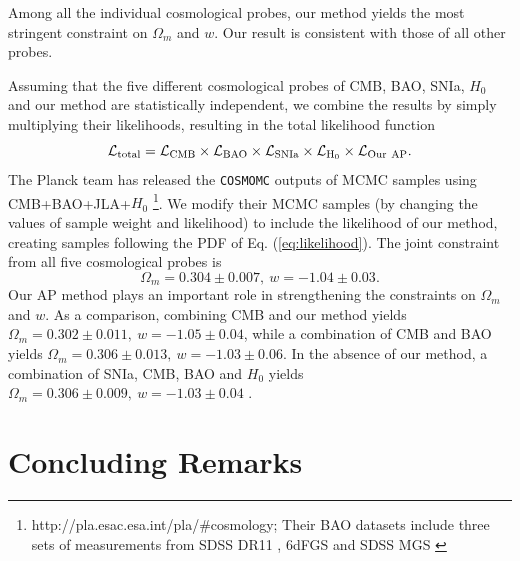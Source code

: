\documentclass[iop]{emulateapj}
\begin{document}
Among all the individual cosmological probes, our method yields the most stringent 
constraint on $\Omega_m$ and $w$.
Our result is consistent with those of all other probes.

Assuming that the five different cosmological probes of CMB, BAO, SNIa, $H_0$ and our method are 
statistically independent,
we combine the results by simply multiplying their likelihoods,
resulting in the total likelihood function
\begin{equation}\label{eq:likelihood}
\mathcal{L}_{\rm total} = \mathcal{L}_{\rm CMB} \times \mathcal{L}_{\rm BAO} \times \mathcal{L}_{\rm SNIa}\times \mathcal{L}_{\rm H_0}
 \times \mathcal{L}_{\rm Our\ AP}.
\end{equation}
The Planck team has released the {\texttt {COSMOMC}} outputs of MCMC samples
using CMB+BAO+JLA+$H_0$
\footnote{http://pla.esac.esa.int/pla/\#cosmology; 
Their BAO datasets include three sets of measurements from SDSS DR11 \citep{Anderson2013}, 6dFGS \citep{6dFGS} and SDSS MGS \citep{MGS}}.
We modify their MCMC samples (by changing the values of sample weight and likelihood)
 to include the likelihood of our method,
creating samples following the PDF of Eq. (\ref{eq:likelihood}).
The joint constraint from all five cosmological probes is
\begin{equation}
 \Omega_m = 0.304 \pm 0.007,\ w=-1.04 \pm 0.03.
\end{equation}
Our AP method plays an important role in strengthening the constraints on $\Omega_m$ and $w$.
As a comparison, combining CMB and our method yields $\Omega_m = 0.302 \pm 0.011,\ w=-1.05 \pm 0.04$,
while a combination of CMB and BAO yields $\Omega_m = 0.306 \pm 0.013,\ w=-1.03 \pm 0.06$.
In the absence of our method, a combination of SNIa, CMB, BAO and $H_0$
yields $\Omega_m = 0.306 \pm 0.009,\ w=-1.03 \pm 0.04$ \citep{Planck2015}.






\section{Concluding Remarks}
\end{document}
